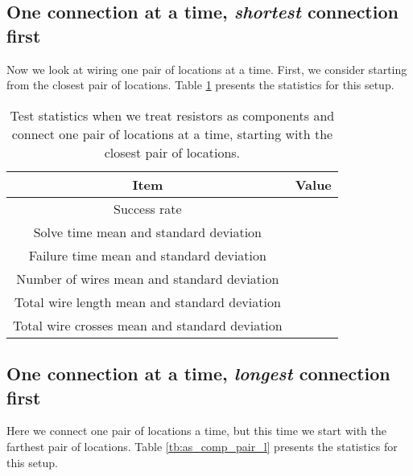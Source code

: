 \subsection{One connection at a time, \textit{shortest} connection first}

Now we look at wiring one pair of locations at a time. First, we consider
starting from the closest pair of locations. Table \ref{tb:as_comp_pair_s}
presents the statistics for this setup.

\begin{table}[H]
\begin{center}
\begin{singlespace}
\begin{tabular}{| c | c |}
\hline
Item & Value \\
\hline\hline
Success rate & \\
Solve time mean and standard deviation & \\
Failure time mean and standard deviation & \\
Number of wires mean and standard deviation & \\
Total wire length mean and standard deviation & \\
Total wire crosses mean and standard deviation & \\
\hline
\end{tabular}
\end{singlespace}
\end{center}
\label{tb:as_comp_pair_s}
\caption{Test statistics when we treat resistors as components and connect one
pair of locations at a time, starting with the closest pair of locations.}
\end{table}

\subsection{One connection at a time, \textit{longest} connection first}

Here we connect one pair of locations a time, but this time we start with the
farthest pair of locations. Table \ref{tb:as_comp_pair_l} presents the
statistics for this setup.

